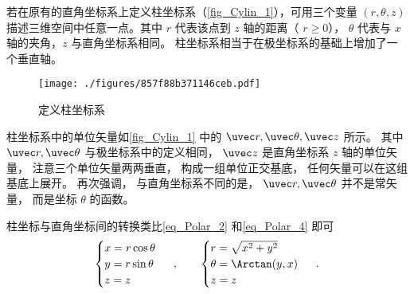 
若在原有的直角坐标系上定义柱坐标系（\autoref{fig_Cylin_1}），可用三个变量 $(r, \theta, z)$ 描述三维空间中任意一点。其中 $r$ 代表该点到 $z$ 轴的距离（ $r \geqslant 0$）， $\theta$ 代表与 $x$ 轴的夹角，$z$ 与直角坐标系相同。 柱坐标系相当于在极坐标系的基础上增加了一个垂直轴。

\begin{figure}[ht]
\centering
\texttt{[image: ./figures/857f88b371146ceb.pdf]}
\caption{定义柱坐标系}\label{fig_Cylin_1}
\end{figure}

柱坐标系中的单位矢量如\autoref{fig_Cylin_1} 中的 $\uvec r,\uvec \theta ,\uvec z$ 所示。 其中 $\uvec r, \uvec \theta$ 与极坐标系中的定义相同， $\uvec z$ 是直角坐标系 $z$ 轴的单位矢量， 注意三个单位矢量两两垂直， 构成一组单位正交基底， 任何矢量可以在这组基底上展开。 再次强调， 与直角坐标系不同的是， $\uvec r, \uvec \theta$ 并不是常矢量， 而是坐标 $\theta$ 的函数。

柱坐标与直角坐标间的转换类比\autoref{eq_Polar_2}  和\autoref{eq_Polar_4}  即可
\begin{equation}
\begin{cases}
x = r\cos \theta \\
y = r\sin \theta \\
z = z
\end{cases}~,
\qquad
\begin{cases}
r = \sqrt {x^2 + y^2} \\
\theta  = \Arctan(y, x)\\
z = z
\end{cases}~.
\end{equation}
